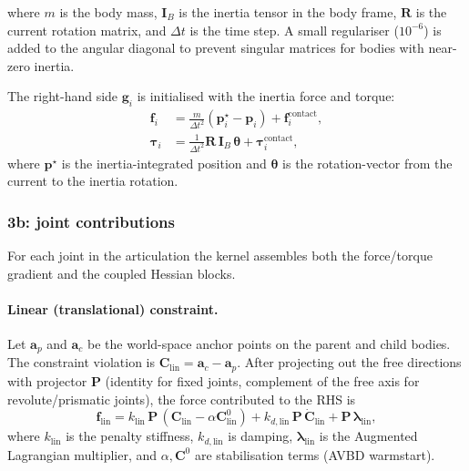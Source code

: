 \documentclass[11pt,a4paper]{article}
\begin{document}
where $m$ is the body mass, $\mathbf{I}_B$ is the inertia tensor in the body
frame, $\mathbf{R}$ is the current rotation matrix, and $\Delta t$ is the time
step.  A small regulariser ($10^{-6}$) is added to the angular diagonal to
prevent singular matrices for bodies with near-zero inertia.

The right-hand side $\mathbf{g}_i$ is initialised with the inertia force and
torque:
\begin{align}
  \mathbf{f}_i &= \frac{m}{\Delta t^2}(\mathbf{p}^\star_i - \mathbf{p}_i)
                  + \mathbf{f}^\text{contact}_i, \\
  \boldsymbol{\tau}_i &= \frac{1}{\Delta t^2}
    \mathbf{R}\,\mathbf{I}_B\,\boldsymbol{\theta}
                  + \boldsymbol{\tau}^\text{contact}_i,
\end{align}
where $\mathbf{p}^\star$ is the inertia-integrated position and $\boldsymbol{\theta}$
is the rotation-vector from the current to the inertia rotation.

\subsubsection{3b: joint contributions}

For each joint in the articulation the kernel assembles both the force/torque
gradient and the coupled Hessian blocks.

\paragraph{Linear (translational) constraint.}
Let $\mathbf{a}_p$ and $\mathbf{a}_c$ be the world-space anchor points on the
parent and child bodies.  The constraint violation is $\mathbf{C}_\text{lin} =
\mathbf{a}_c - \mathbf{a}_p$.  After projecting out the free directions with
projector $\mathbf{P}$ (identity for fixed joints, complement of the free axis
for revolute/prismatic joints), the force contributed to the RHS is
\begin{equation}
  \mathbf{f}_\text{lin} = k_\text{lin} \,\mathbf{P}\,
    (\mathbf{C}_\text{lin} - \alpha \mathbf{C}^0_\text{lin})
    + k_{d,\text{lin}} \,\mathbf{P}\, \dot{\mathbf{C}}_\text{lin}
    + \mathbf{P}\,\boldsymbol{\lambda}_\text{lin},
  \label{eq:f_lin}
\end{equation}
where $k_\text{lin}$ is the penalty stiffness, $k_{d,\text{lin}}$ is damping,
$\boldsymbol{\lambda}_\text{lin}$ is the Augmented Lagrangian multiplier, and
$\alpha, \mathbf{C}^0$ are stabilisation terms (AVBD warmstart).
\end{document}
